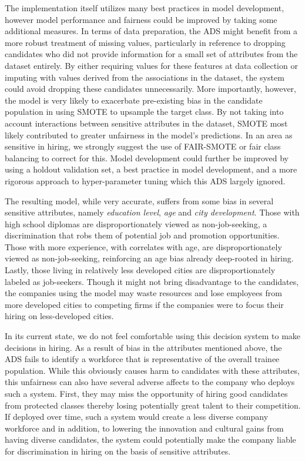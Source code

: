 The implementation itself utilizes many best practices in model development, however model performance and fairness could be improved by taking some additional measures.  In terms of data preparation, the ADS might benefit from a more robust treatment of missing values, particularly in reference to dropping candidates who did not provide information for a small set of attributes from the dataset entirely.  By either requiring values for these features at data collection or imputing with values derived from the associations in the dataset, the system could avoid dropping these candidates unnecessarily.  More importantly, however, the model is very likely to exacerbate pre-existing bias in the candidate population in using SMOTE to upsample the target class.  By not taking into account interactions between sensitive attributes in the dataset, SMOTE most likely contributed to greater unfairness in the model's predictions.  In an area as sensitive in hiring, we strongly suggest the use of FAIR-SMOTE or fair class balancing to correct for this.  Model development could further be improved by using a holdout validation set, a best practice in model development, and a more rigorous approach to hyper-parameter tuning which this ADS largely ignored.

The resulting model, while very accurate, suffers from some bias in several sensitive attributes, namely \emph{education level}, \emph{age} and \emph{city development}. Those with high school diplomas are disproportionately viewed as non-job-seeking, a discrimination that robs them of potential job and promotion opportunities. Those with more experience, with correlates with age, are disproportionately viewed as non-job-seeking, reinforcing an age bias already deep-rooted in hiring. Lastly, those living in relatively less developed cities are disproportionately labeled as job-seekers. Though it might not bring disadvantage to the candidates, the companies using the model may waste resources and lose employees from more developed cities to competing firms if the companies were to focus their hiring on less-developed cities.


In its current state, we do not feel comfortable using this decision system to make decisions in hiring. As a result of bias in the attributes mentioned above, the ADS fails to identify a workforce that is representative of the overall trainee population. While this obviously causes harm to candidates with these attributes, this unfairness can also have several adverse affects to the company who deploys such a system.  First, they may miss the opportunity of hiring good candidates from protected classes thereby losing potentially great talent to their competition. If deployed over time, such a system would create a less diverse company workforce and in addition, to lowering the innovation and cultural gains from having diverse candidates, the system could potentially make the company liable for discrimination in hiring on the basis of sensitive attributes.





